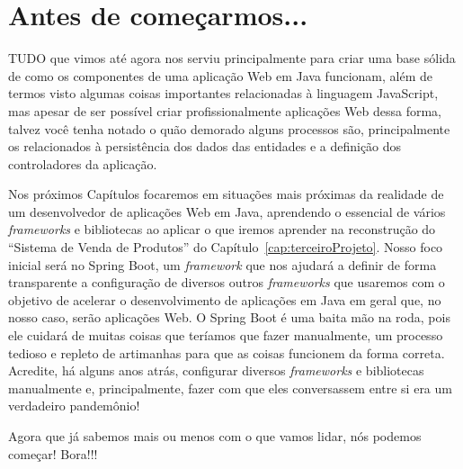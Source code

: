 \chapter*{Antes de começarmos...}

\lettrine[lines=4, lhang=0.1, lraise=0, loversize=0.2, findent=0.1em]{\textcolor{corAzulTema}{T}}{UDO} que vimos até agora nos serviu principalmente para criar uma base sólida de como os componentes de uma aplicação Web em Java funcionam, além de termos visto algumas coisas importantes relacionadas à linguagem JavaScript, mas apesar de ser possível criar profissionalmente aplicações Web dessa forma, talvez você tenha notado o quão demorado alguns processos são, principalmente os relacionados à persistência dos dados das entidades e a definição dos controladores da aplicação.

Nos próximos Capítulos focaremos em situações mais próximas da realidade de um desenvolvedor de aplicações Web em Java, aprendendo o essencial de vários \textit{frameworks} e bibliotecas ao aplicar o que iremos aprender na reconstrução do ``Sistema de Venda de Produtos'' do Capítulo~\ref{cap:terceiroProjeto}. Nosso foco inicial será no Spring Boot, um \textit{framework} que nos ajudará a definir de forma transparente a configuração de diversos outros \textit{frameworks} que usaremos com o objetivo de acelerar o desenvolvimento de aplicações em Java em geral que, no nosso caso, serão aplicações Web. O Spring Boot é uma baita mão na roda, pois ele cuidará de muitas coisas que teríamos que fazer manualmente, um processo tedioso e repleto de artimanhas para que as coisas funcionem da forma correta. Acredite, há alguns anos atrás, configurar diversos \textit{frameworks} e bibliotecas manualmente e, principalmente, fazer com que eles conversassem entre si era um verdadeiro pandemônio!

Agora que já sabemos mais ou menos com o que vamos lidar, nós podemos começar! Bora!!!
